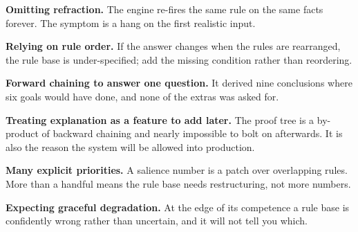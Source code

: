 \begin{pitfall}
\begin{tight}
  \item \textbf{Omitting refraction.} The engine re-fires the same rule on the same
        facts forever. The symptom is a hang on the first realistic input.
  \item \textbf{Relying on rule order.} If the answer changes when the rules are
        rearranged, the rule base is under-specified; add the missing condition
        rather than reordering.
  \item \textbf{Forward chaining to answer one question.} It derived nine
        conclusions where six goals would have done, and none of the extras was
        asked for.
  \item \textbf{Treating explanation as a feature to add later.} The proof tree is
        a by-product of backward chaining and nearly impossible to bolt on
        afterwards. It is also the reason the system will be allowed into
        production.
  \item \textbf{Many explicit priorities.} A salience number is a patch over
        overlapping rules. More than a handful means the rule base needs
        restructuring, not more numbers.
  \item \textbf{Expecting graceful degradation.} At the edge of its competence a
        rule base is confidently wrong rather than uncertain, and it will not tell
        you which.
\end{tight}
\end{pitfall}

